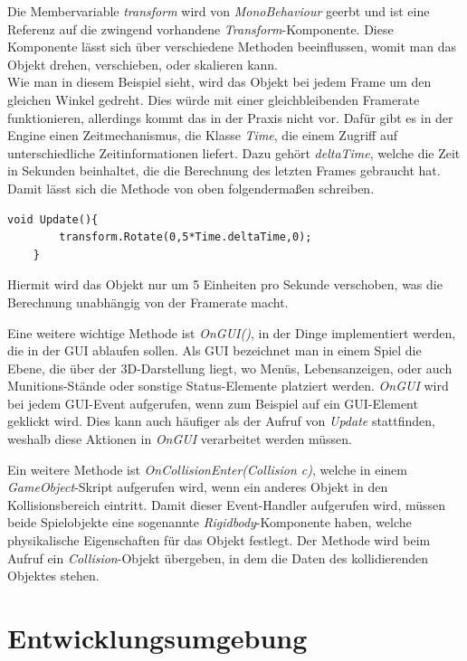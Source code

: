 Die Membervariable \textit{transform} wird von \textit{MonoBehaviour} geerbt und ist eine Referenz auf die zwingend vorhandene \textit{Transform}-Komponente. Diese Komponente lässt sich über verschiedene Methoden beeinflussen, womit man das Objekt drehen, verschieben, oder skalieren kann.\\
Wie man in diesem Beispiel sieht, wird das Objekt bei jedem Frame um den gleichen Winkel gedreht. Dies würde mit einer gleichbleibenden Framerate funktionieren, allerdings kommt das in der Praxis nicht vor. Dafür gibt es in der Engine einen Zeitmechanismus, die Klasse \textit{Time}, die einem Zugriff auf unterschiedliche Zeitinformationen liefert. Dazu gehört \textit{deltaTime}, welche die Zeit in Sekunden beinhaltet, die die Berechnung des letzten Frames gebraucht hat. Damit lässt sich die Methode von oben folgendermaßen schreiben.
\pagebreak

\begin{lstlisting}[caption={[Einfache Update-Methode mit deltaTime]Einfache Update-Methode mit deltaTime}]
	void Update(){
		transform.Rotate(0,5*Time.deltaTime,0);
	}
\end{lstlisting}

Hiermit wird das Objekt nur um 5 Einheiten pro Sekunde verschoben, was die Berechnung unabhängig von der Framerate macht.

Eine weitere wichtige Methode ist \textit{OnGUI()}, in der Dinge implementiert werden, die in der GUI ablaufen sollen. Als GUI bezeichnet man in einem Spiel die Ebene, die über der 3D-Darstellung liegt, wo Menüs, Lebensanzeigen, oder auch Munitions-Stände oder sonstige Status-Elemente platziert werden. \textit{OnGUI} wird bei jedem GUI-Event aufgerufen, wenn zum Beispiel auf ein GUI-Element geklickt wird. Dies kann auch häufiger als der Aufruf von \textit{Update} stattfinden, weshalb diese Aktionen in \textit{OnGUI} verarbeitet werden müssen.

Ein weitere Methode ist \textit{OnCollisionEnter(Collision c)}, welche in einem \textit{GameObject}-Skript aufgerufen wird, wenn ein anderes Objekt in den Kollisionsbereich eintritt. Damit dieser Event-Handler aufgerufen wird, müssen beide Spielobjekte eine sogenannte \textit{Rigidbody}-Komponente haben, welche physikalische Eigenschaften für das Objekt festlegt. Der Methode wird beim Aufruf ein \textit{Collision}-Objekt übergeben, in dem die Daten des kollidierenden Objektes stehen.
\pagebreak

\section{Entwicklungsumgebung}

